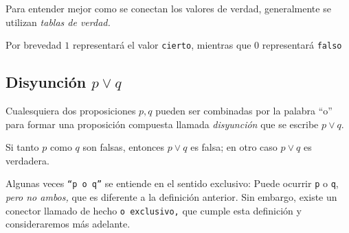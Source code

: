    \begin{observacion}
        Para entender mejor como se conectan los valores de verdad, generalmente se utilizan \emph{tablas de verdad.}  
        
        Por brevedad $1$ representará el valor \texttt{cierto}, mientras que $0$ representará \texttt{falso}
    \end{observacion}
    

\subsection{Disyunción $p \vee q$}


    Cualesquiera dos proposiciones $p,q$ pueden ser combinadas por la palabra ``o'' para formar una proposición compuesta llamada \emph{disyunción} que se escribe $p \vee q .$



    \begin{definicion}
        Si tanto $p$ como $q$ son falsas, entonces $p \vee q$ es falsa; en otro caso $p\vee q$ es verdadera.
    \end{definicion}
 \begin{observacion}
  Algunas veces \texttt{``p o q''} se entiende en el sentido exclusivo: Puede ocurrir \texttt{p} o \texttt{q}, \emph{pero no ambos,} que es diferente a la definición anterior. Sin embargo, existe un conector llamado de hecho \texttt{o exclusivo,} que cumple esta definición y consideraremos más adelante. 
 \end{observacion}



